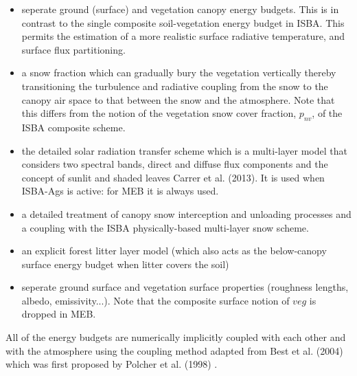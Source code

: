 \begin{itemize}

\item seperate ground (surface) and vegetation canopy energy
  budgets. This is in contrast to the single composite soil-vegetation
  energy budget in ISBA. This permits the estimation of 
  a more realistic surface radiative temperature, and surface flux
  partitioning. 

\item a snow fraction which can gradually bury the vegetation
  vertically thereby transitioning the turbulence and radiative 
  coupling from the
  snow to the canopy air space to that between the snow and
  the atmosphere. Note that this differs from the notion of
  the vegetation snow cover fraction, $p_{nv}$, of the ISBA composite scheme.

\item the detailed solar radiation transfer scheme  
  which is a multi-layer model that
  considers two spectral bands, direct and diffuse
  flux components and the concept of sunlit and shaded leaves 
  Carrer et al. (2013)\nocite{carrer_ea_2013}.
  It is used when ISBA-Ags is active: for MEB it is always used.

\item a detailed treatment of canopy snow interception and
  unloading processes and a coupling
  with the ISBA physically-based multi-layer snow scheme.



\item an explicit forest litter layer model (which also acts as the
  below-canopy surface energy budget when litter covers the soil)

\item seperate ground surface and vegetation surface properties
  (roughness lengths, albedo, emissivity...). Note that the composite
  surface notion of $veg$ is dropped in MEB.

\end{itemize}
\noindent
%
All of the energy budgets are
numerically implicitly coupled with each other and with the atmosphere
using the coupling method adapted from Best et al. (2004)
\nocite{Best2004} 
which was
first proposed by Polcher et al. (1998)
\nocite{Polcher1998}.

